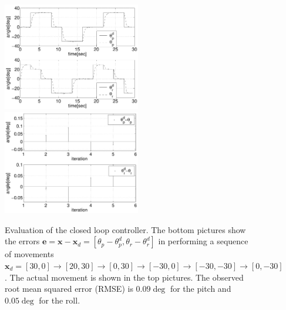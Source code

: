 \documentclass[conference]{IEEEtran}
\numberwithin{equation}{section}
\newcommand{\x}{\mathbf{x}}
\begin{document}
\begin{figure}[tbp]
\centering 
\includegraphics[width=60mm]{image/AngleJacobian.pdf} 
\includegraphics[width=60mm]{image/ErrorsJacobian.pdf} 
\caption{Evaluation of the closed loop controller. The bottom pictures show the errors $\mathbf e = \x - \x_d = [\theta_p - \theta_p^d, \theta_r - \theta_r^d]$ in performing a sequence of movements $\x_d = [30, 0] \rightarrow[20, 30] \rightarrow[0, 30] \rightarrow[-30, 0] \rightarrow[-30, -30] \rightarrow[0, -30]$. The actual movement is shown in the top pictures. The observed root mean squared error (RMSE) is $0.09 \deg$ for the pitch and $0.05 \deg$ for the roll.}
\label{Fig:ErrorJacobian}
\end{figure}
\end{document}
